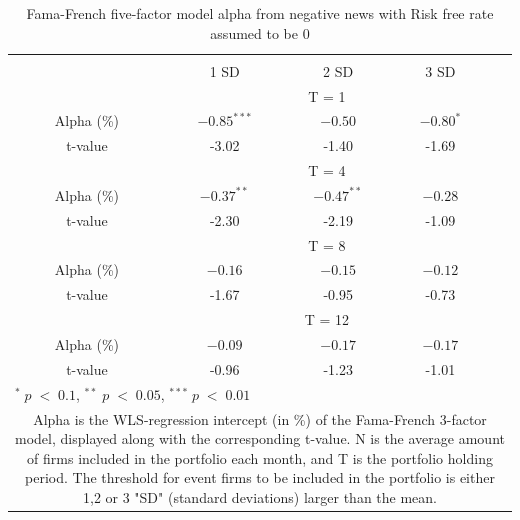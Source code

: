 \setlength{\tabcolsep}{15pt}
\begin{table}[]
\small
\centering
\caption{Fama-French five-factor model alpha from negative news with Risk free rate assumed to be 0} 
\begin{tabular}{ccccccc}
\hline \hline \\ 
 &     &  &    1 SD  &  2 SD  &  3 SD  &  \\ \cline{4-6} 
& & & \multicolumn{3}{c}{ T = 1} & \\ \cline{2-6}
& Alpha (\%)  &  & $-0.85^{***}$  & $-0.50$  & $-0.80^{*}$ &  \\
& t-value &  & -3.02 & -1.40  & -1.69 & \\
& & & \multicolumn{3}{c}{ T = 4} & \\ \cline{2-6}
& Alpha (\%)  &  & $-0.37^{**}$  & $-0.47^{**}$  &  $-0.28$ & \\
& t-value & & -2.30 & -2.19 & -1.09 & \\
& & & \multicolumn{3}{c}{ T = 8} & \\ \cline{2-6}
& Alpha (\%)  &  & $-0.16$   & $-0.15$  & $-0.12$ &  \\
& t-value &  & -1.67  & -0.95 & -0.73 & \\
&  & & \multicolumn{3}{c}{ T = 12} & \\ \cline{2-6}
& Alpha (\%)  &  & $-0.09$  & $-0.17$  & $-0.17$ &  \\
& t-value &  & -0.96  & -1.23 & -1.01 & \\
\hline \hline
 \multicolumn{7}{l}{ \footnotesize $^* \; p\; <\; 0.1$, $ ^{**} \; p\; <\; 0.05$, $ ^{***} \; p\; <\; 0.01$  } \\
 \multicolumn{7}{p{11.5cm}}{ \footnotesize Alpha is the WLS-regression intercept (in \%) of the Fama-French 3-factor model, displayed along with the corresponding t-value. N is the average amount of firms included in the portfolio each month, and T is the portfolio holding period. The threshold for event firms to be included in the portfolio is either 1,2 or 3 "SD" (standard deviations) larger than the mean.}  \\ 
\end{tabular}
\label{tab: FF5_neg_sensi_rf}
\end{table}









